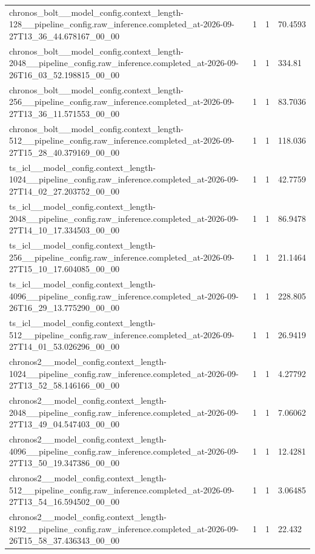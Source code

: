 \begin{tabular}{llll}
chronos\_bolt\_\_model\_config.context\_length-128\_\_pipeline\_config.raw\_inference.completed\_at-2026-09-27T13\_36\_44.678167\_00\_00 & 1 & 1 & 70.4593 \\
chronos\_bolt\_\_model\_config.context\_length-2048\_\_pipeline\_config.raw\_inference.completed\_at-2026-09-26T16\_03\_52.198815\_00\_00 & 1 & 1 & 334.81 \\
chronos\_bolt\_\_model\_config.context\_length-256\_\_pipeline\_config.raw\_inference.completed\_at-2026-09-27T13\_36\_11.571553\_00\_00 & 1 & 1 & 83.7036 \\
chronos\_bolt\_\_model\_config.context\_length-512\_\_pipeline\_config.raw\_inference.completed\_at-2026-09-27T15\_28\_40.379169\_00\_00 & 1 & 1 & 118.036 \\
ts\_icl\_\_model\_config.context\_length-1024\_\_pipeline\_config.raw\_inference.completed\_at-2026-09-27T14\_02\_27.203752\_00\_00 & 1 & 1 & 42.7759 \\
ts\_icl\_\_model\_config.context\_length-2048\_\_pipeline\_config.raw\_inference.completed\_at-2026-09-27T14\_10\_17.334503\_00\_00 & 1 & 1 & 86.9478 \\
ts\_icl\_\_model\_config.context\_length-256\_\_pipeline\_config.raw\_inference.completed\_at-2026-09-27T15\_10\_17.604085\_00\_00 & 1 & 1 & 21.1464 \\
ts\_icl\_\_model\_config.context\_length-4096\_\_pipeline\_config.raw\_inference.completed\_at-2026-09-26T16\_29\_13.775290\_00\_00 & 1 & 1 & 228.805 \\
ts\_icl\_\_model\_config.context\_length-512\_\_pipeline\_config.raw\_inference.completed\_at-2026-09-27T14\_01\_53.026296\_00\_00 & 1 & 1 & 26.9419 \\
chronos2\_\_model\_config.context\_length-1024\_\_pipeline\_config.raw\_inference.completed\_at-2026-09-27T13\_52\_58.146166\_00\_00 & 1 & 1 & 4.27792 \\
chronos2\_\_model\_config.context\_length-2048\_\_pipeline\_config.raw\_inference.completed\_at-2026-09-27T13\_49\_04.547403\_00\_00 & 1 & 1 & 7.06062 \\
chronos2\_\_model\_config.context\_length-4096\_\_pipeline\_config.raw\_inference.completed\_at-2026-09-27T13\_50\_19.347386\_00\_00 & 1 & 1 & 12.4281 \\
chronos2\_\_model\_config.context\_length-512\_\_pipeline\_config.raw\_inference.completed\_at-2026-09-27T13\_54\_16.594502\_00\_00 & 1 & 1 & 3.06485 \\
chronos2\_\_model\_config.context\_length-8192\_\_pipeline\_config.raw\_inference.completed\_at-2026-09-26T15\_58\_37.436343\_00\_00 & 1 & 1 & 22.432 \\

\end{tabular}
